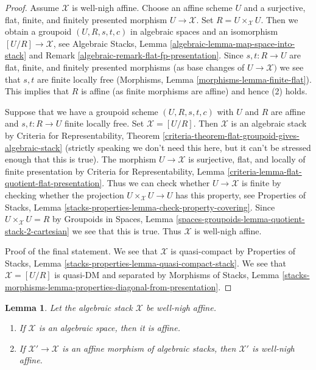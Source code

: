 \documentclass[10pt,a4paper]{amsart}
\theoremstyle{plain}
\newtheorem{lemma}[subsection]{Lemma}
\theoremstyle{definition}
\theoremstyle{remark}
\numberwithin{equation}{subsection}
\begin{document}
\begin{proof}
Assume $\mathcal{X}$ is well-nigh affine. Choose an affine scheme $U$
and a surjective, flat, finite, and finitely presented morphism
$U \to \mathcal{X}$. Set $R = U \times_\mathcal{X} U$. Then we
obtain a groupoid $(U, R, s, t, c)$ in algebraic spaces and an
isomorphism $[U/R] \to \mathcal{X}$, see
Algebraic Stacks, Lemma \ref{algebraic-lemma-map-space-into-stack}
and Remark \ref{algebraic-remark-flat-fp-presentation}.
Since $s, t : R \to U$ are 
flat, finite, and finitely presented morphisms
(as base changes of $U \to \mathcal{X})$ we see that
$s, t$ are finite locally free
(Morphisms, Lemma \ref{morphisms-lemma-finite-flat}).
This implies that $R$ is affine (as finite morphisms are affine)
and hence (2) holds.

\medskip\noindent
Suppose that we have a groupoid scheme $(U, R, s, t, c)$ with $U$ and
$R$ are affine and $s, t : R \to U$ finite locally free.
Set $\mathcal{X} = [U/R]$. Then $\mathcal{X}$ is an algebraic stack
by Criteria for Representability, Theorem
\ref{criteria-theorem-flat-groupoid-gives-algebraic-stack} (strictly speaking
we don't need this here, but it can't be stressed enough that this is true).
The morphism $U \to \mathcal{X}$ is surjective, flat, and locally
of finite presentation by
Criteria for Representability, Lemma
\ref{criteria-lemma-flat-quotient-flat-presentation}.
Thus we can check whether $U \to \mathcal{X}$ is finite by
checking whether the projection $U \times_\mathcal{X} U \to U$
has this property, see Properties of Stacks, Lemma
\ref{stacks-properties-lemma-check-property-covering}.
Since $U \times_\mathcal{X} U = R$ by
Groupoids in Spaces, Lemma
\ref{spaces-groupoids-lemma-quotient-stack-2-cartesian}
we see that this is true. Thus $\mathcal{X}$ is well-nigh affine.

\medskip\noindent
Proof of the final statement. We see that $\mathcal{X}$
is quasi-compact by Properties of Stacks, Lemma
\ref{stacks-properties-lemma-quasi-compact-stack}.
We see that $\mathcal{X} = [U/R]$ is quasi-DM and separated by
Morphisms of Stacks, Lemma
\ref{stacks-morphisms-lemma-properties-diagonal-from-presentation}.
\end{proof}

\begin{lemma}
\label{lemma-affine-over-well-nigh-affine}
Let the algebraic stack $\mathcal{X}$ be well-nigh affine.
\begin{enumerate}
\item If $\mathcal{X}$ is an algebraic space, then it is affine.
\item If $\mathcal{X}' \to \mathcal{X}$ is an affine morphism
of algebraic stacks, then $\mathcal{X}'$ is well-nigh affine.
\end{enumerate}
\end{lemma}
\end{document}
